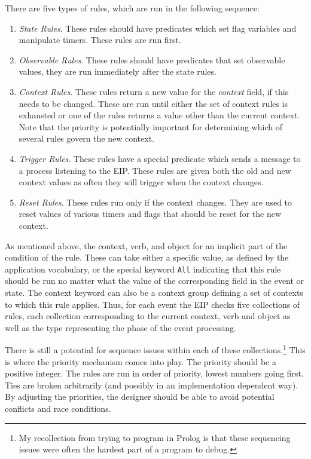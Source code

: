 \documentclass{article}
\begin{document}
  There are five types of rules, which are run in the following
  sequence:
  \begin{enumerate}
  \item \textit{State Rules}.  These rules should have predicates
    which set flag variables and manipulate timers.  These rules are
    run first.
  \item \textit{Observable Rules}.  These rules should have predicates
    that set observable values, they are run immediately after the
    state rules.
  \item \textit{Context Rules}.  These rules return a new value for
    the \textit{context} field, if this needs to be changed.  These
    are run until either the set of context rules is exhausted or one
    of the rules returns a value other than the current context.  Note
    that the priority is potentially important for determining which
    of several rules govern the new context.
  \item \textit{Trigger Rules}.  These rules have a special predicate
    which sends a message to a process listening to the EIP.  These
    rules are given both the old and new context values as often they
    will trigger when the context changes.
  \item \textit{Reset Rules}.  These rules run only if the context
    changes.  They are used to reset values of various timers and
    flags that should be reset for the new context.
  \end{enumerate}

  As mentioned above, the context, verb, and object for an implicit
  part of the condition of the rule.  These can take either a specific
  value, as defined by the application vocabulary, or the special
  keyword \texttt{All} indicating that this rule should be run no
  matter what the value of the corresponding field in the event or
  state.  The context keyword can also be a context group defining a
  set of contexts to which this rule applies.  Thus, for each event
  the EIP checks five collections of rules, each collection
  corresponding to the current context, verb and object as well as the
  type representing the phase of the event processing.

  There is still a potential for sequence issues within each of these
  collections.\footnote{My recollection from trying to program in
    Prolog is that these sequencing issues were often the hardest part
    of a program to debug.}  This is where the priority mechanism
  comes into play. The priority should be a positive integer.  The
  rules are run in order of priority, lowest numbers going first.
  Ties are broken arbitrarily (and possibly in an implementation
  dependent way).  By adjusting the priorities, the designer should be
  able to avoid potential conflicts and race conditions.
\end{document}
